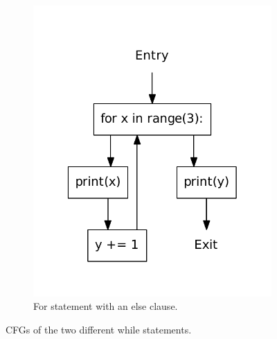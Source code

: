 \begin{figure}
\begin{subfigure}[b]{.4\textwidth}
    \includegraphics[scale=.5]{./figures/for_complete.pdf}
    \caption{For statement with an else clause.}
    \label{fig:while:for_else}
  \end{subfigure}  
  \caption{CFGs of the two different while statements.}
  \label{fig:for}
\end{figure}
